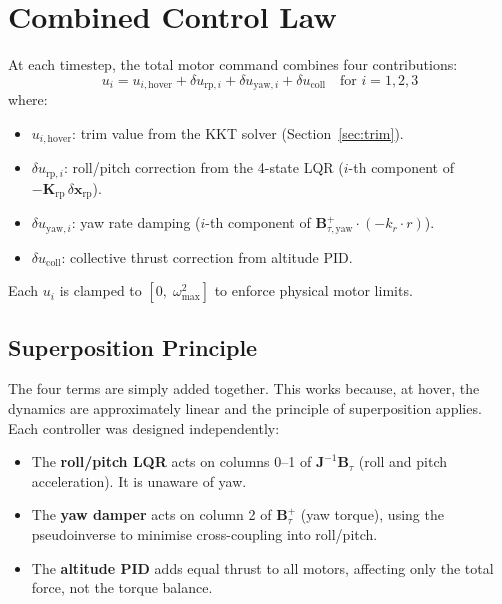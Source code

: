 \documentclass[12pt, a4paper]{article}
\newcommand{\bx}{\bm{x}}
\newcommand{\bJ}{\bm{J}}
\newcommand{\bK}{\bm{K}}
\newcommand{\bB}{\bm{B}}
\begin{document}
\section{Combined Control Law}
\label{sec:combined}

At each timestep, the total motor command combines four contributions:
\begin{equation}
    \boxed{
    u_i = u_{i,\text{hover}} + \delta u_{\text{rp},i} + \delta u_{\text{yaw},i} + \delta u_{\text{coll}}
    }
    \quad \text{for } i = 1, 2, 3
\end{equation}
where:
\begin{itemize}
    \item $u_{i,\text{hover}}$: trim value from the KKT solver (Section~\ref{sec:trim}).
    \item $\delta u_{\text{rp},i}$: roll/pitch correction from the 4-state LQR ($i$-th component of $-\bK_{\text{rp}} \, \delta\bx_{\text{rp}}$).
    \item $\delta u_{\text{yaw},i}$: yaw rate damping ($i$-th component of $\bB_{\tau,\text{yaw}}^+ \cdot (-k_r \cdot r)$).
    \item $\delta u_{\text{coll}}$: collective thrust correction from altitude PID.
\end{itemize}

Each $u_i$ is clamped to $[0, \; \omega_{\max}^2]$ to enforce physical motor limits.

\subsection{Superposition Principle}

The four terms are simply added together.  This works because, at hover, the dynamics are approximately linear and the principle of superposition applies.  Each controller was designed independently:

\begin{itemize}
    \item The \textbf{roll/pitch LQR} acts on columns 0--1 of $\bJ^{-1}\bB_\tau$ (roll and pitch acceleration).  It is unaware of yaw.
    \item The \textbf{yaw damper} acts on column 2 of $\bB_\tau^+$ (yaw torque), using the pseudoinverse to minimise cross-coupling into roll/pitch.
    \item The \textbf{altitude PID} adds equal thrust to all motors, affecting only the total force, not the torque balance.
\end{itemize}
\end{document}
